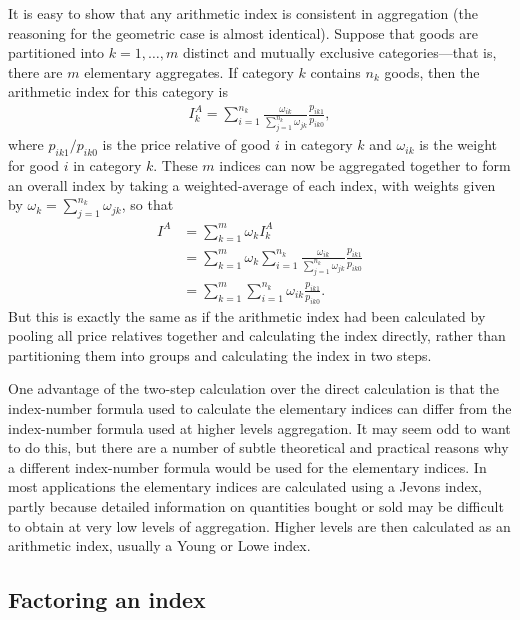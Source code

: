 \documentclass[]{article}
\begin{document}
It is easy to show that any arithmetic index is consistent in aggregation (the reasoning for the geometric case is almost identical). Suppose that goods are partitioned into \(k=1,\ldots,m\) distinct and mutually exclusive categories---that is, there are \(m\) elementary aggregates. If category \(k\) contains \(n_{k}\) goods, then the arithmetic index for this category is
\begin{align*}
I_{k}^{A} = \sum_{i = 1}^{n_k} \frac{\omega_{ik}}{\sum_{j = 1}^{n_k} \omega_{jk}} \frac{p_{ik1}}{p_{ik0}},
\end{align*}
where \(p_{ik1} / p_{ik0}\) is the price relative of good \(i\) in category \(k\) and \(\omega_{ik}\) is the weight for good \(i\) in category \(k\). These \(m\) indices can now be aggregated together to form an overall index by taking a weighted-average of each index, with weights given by \(\omega_{k} = \sum_{j = 1}^{n_k} \omega_{jk}\), so that
\begin{align*}
I^{A} &= \sum_{k = 1}^{m} \omega_k I_{k}^{A}  \\
&= \sum_{k = 1}^{m} \omega_k \sum_{i = 1}^{n_k} \frac{\omega_{ik}}{\sum_{j = 1}^{n_k} \omega_{jk}} \frac{p_{ik1}}{p_{ik0}} \\
&= \sum_{k = 1}^{m} \sum_{i = 1}^{n_k} \omega_{ik} \frac{p_{ik1}}{p_{ik0}}.
\end{align*}
But this is exactly the same as if the arithmetic index had been calculated by pooling all price relatives together and calculating the index directly, rather than partitioning them into groups and calculating the index in two steps.

One advantage of the two-step calculation over the direct calculation is that the index-number formula used to calculate the elementary indices can differ from the index-number formula used at higher levels aggregation. It may seem odd to want to do this, but there are a number of subtle theoretical and practical reasons why a different index-number formula would be used for the elementary indices. In most applications the elementary indices are calculated using a Jevons index, partly because detailed information on quantities bought or sold may be difficult to obtain at very low levels of aggregation. Higher levels are then calculated as an arithmetic index, usually a Young or Lowe index.

\hypertarget{factoring-an-index}{%
\subsection{Factoring an index}\label{factoring-an-index}}
\end{document}

